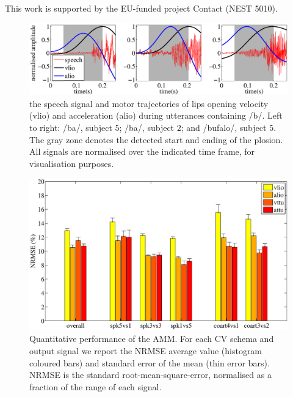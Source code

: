 \documentclass{pnastwo}
\newcommand{\vlio}{\textsf{vlio}}
\newcommand{\alio}{\textsf{alio}}
\begin{document}
\begin{article}








\begin{acknowledgments}
  This work is supported by the EU-funded project Contact (NEST 5010).
\end{acknowledgments}


 

\end{article}


\begin{figure}[t]
  \centerline{\includegraphics[width=\textwidth]{figs/figSamples}}
  \caption{the speech signal and motor trajectories of lips opening
    velocity (\vlio) and acceleration (\alio) during utterances containing /b/.
    Left to right: /ba/, subject $5$; /ba/, subject $2$; and /bufalo/, subject $5$.
    The gray zone denotes the detected start and ending of the plosion. All signals
    are normalised over the indicated time frame, for visualisation purposes.}
  \label{fig:isdView}
\end{figure}

\begin{figure}[t]
  \centerline{\includegraphics[width=.5\textwidth]{figs/figAMM}}
  \caption{Quantitative performance of the AMM. For each CV schema and output signal
    we report the NRMSE average value (histogram coloured bars) and standard error of
    the mean (thin error bars). NRMSE is the standard root-mean-square-error, normalised
    as a fraction of the range of each signal.}
  \label{fig:amm_perf}
\end{figure}
\end{document}
